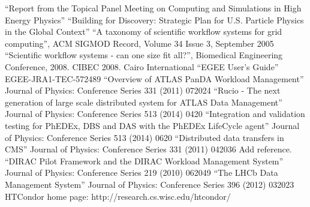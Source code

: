 \begin{thebibliography}{99}
 ``Report from the Topical Panel Meeting on Computing and
Simulations in High Energy Physics''
 ``Building for Discovery: Strategic Plan for U.S. Particle Physics in the Global Context''
 ``A taxonomy of scientific workflow systems for grid computing'', ACM SIGMOD Record, Volume 34 Issue 3, September 2005
 ``Scientific workflow systems - can one size fit all?'', Biomedical Engineering Conference, 2008. CIBEC 2008. Cairo International
 ``EGEE User’s Guide'' EGEE-JRA1-TEC-572489
 ``Overview of ATLAS PanDA Workload Management'' Journal of Physics: Conference Series 331 (2011) 072024
 ``Rucio - The next generation of large scale distributed system for ATLAS Data Management'' Journal of Physics: Conference Series 513 (2014) 0420
 ``Integration and validation testing for PhEDEx, DBS and DAS with the PhEDEx LifeCycle agent'' Journal of Physics: Conference Series 513 (2014) 0620
 ``Distributed data transfers in CMS'' Journal of Physics: Conference Series 331 (2011) 042036
 Add reference.
 ``DIRAC Pilot Framework and the DIRAC Workload Management System'' Journal of Physics: Conference Series 219 (2010) 062049
 ``The LHCb Data Management System'' Journal of Physics: Conference Series 396 (2012) 032023
 HTCondor home page: http://research.cs.wisc.edu/htcondor/
\end{thebibliography}
